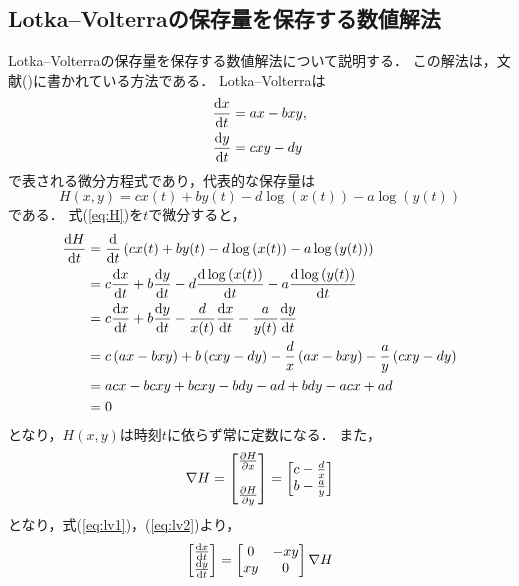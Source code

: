 \subsection{Lotka--Volterraの保存量を保存する数値解法}
Lotka--Volterraの保存量を保存する数値解法について説明する．
この解法は，文献(\cite{BB02105565})に書かれている方法である．
Lotka--Volterraは
\begin{align}
    \label{eq:lv1}
    \frac{\mathrm{d}x}{\mathrm{d}t} &= a x - b xy,\\
    \label{eq:lv2}
    \frac{\mathrm{d}y}{\mathrm{d}t} &= c xy - d y
\end{align}
で表される微分方程式であり，代表的な保存量は
\begin{equation}
    \label{eq:H}
    H(x,y) = cx(t) + by(t) - d\log\left(x(t)\right) - a\log\left(y(t)\right)
\end{equation}
である．
式(\ref{eq:H})を$t$で微分すると，
\begin{align*}
    \frac{\mathrm{d}H}{\mathrm{d}t} &= \frac{\mathrm{d}}{\mathrm{d}t}\left(cx(t) + by(t) - d\log\left(x(t)\right) - a\log\left(y(t)\right)\right) \\
    &= c\frac{\mathrm{d}x}{\mathrm{d}t} + b\frac{\mathrm{d}y}{\mathrm{d}t} - d\frac{\mathrm{d}\log\left(x(t)\right)}{\mathrm{d}t} - a\frac{\mathrm{d}\log\left(y(t)\right)}{\mathrm{d}t} \\
    &= c\frac{\mathrm{d}x}{\mathrm{d}t} + b\frac{\mathrm{d}y}{\mathrm{d}t} - \frac{d}{x(t)}\frac{\mathrm{d}x}{\mathrm{d}t} - \frac{a}{y(t)}\frac{\mathrm{d}y}{\mathrm{d}t} \\
    &= c\left(ax - bxy\right) + b\left(cxy - dy\right) - \frac{d}{x}\left(ax - bxy\right) - \frac{a}{y}\left(cxy - dy\right) \\
    &= acx - bcxy + bcxy - bdy - ad + bdy - acx + ad \\
    &= 0
\end{align*}
となり，$H(x,y)$は時刻$t$に依らず常に定数になる．
また，
\begin{align}
    \nabla H = \begin{bmatrix}
        \frac{\partial H}{\partial x} \\  \\
        \frac{\partial H}{\partial y}
    \end{bmatrix} =
    \begin{bmatrix}
        c - \frac{d}{x} \\
        b - \frac{a}{y}
    \end{bmatrix}
\end{align}
となり，式(\ref{eq:lv1})，(\ref{eq:lv2})より，
\begin{align}
    \label{eq:lv3}
    \begin{bmatrix}
        \frac{\mathrm{d}x}{\mathrm{d}t} \\ 
        \frac{\mathrm{d}y}{\mathrm{d}t}
    \end{bmatrix}
    = 
    \begin{bmatrix}
        0 & -xy \\
        xy & 0
    \end{bmatrix}
    \nabla H
\end{align}
